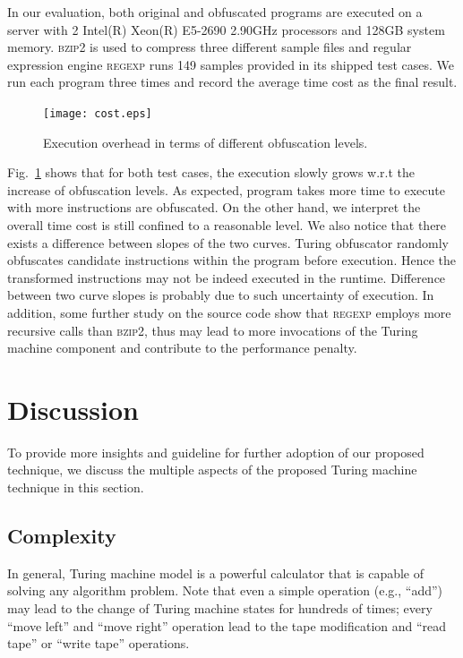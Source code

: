 \documentclass[lnicst]{svmultln}
\newcommand{\F}{Fig.}
\begin{document}
In our evaluation, both original and obfuscated programs are executed on a
server with 2 Intel(R) Xeon(R) E5-2690 2.90GHz processors and 128GB system
memory. \textsc{bzip2} is used to compress three different sample files and
regular expression engine \textsc{regexp} runs 149 samples provided in its
shipped test cases. We run each program three times and record the average
time cost as the final result.

\begin{figure}
  \texttt{[image: cost.eps]}
  \caption{Execution overhead in terms of different obfuscation levels.}
  \label{fig:cost}
\end{figure}

\F~\ref{fig:cost} shows that for both test cases, the execution slowly grows
w.r.t the increase of obfuscation levels. As expected, program takes more time
to execute with more instructions are obfuscated. On the other hand, we
interpret the overall time cost is still confined to a reasonable level. We also
notice that there exists a difference between slopes of the two curves. Turing
obfuscator randomly obfuscates candidate instructions within the program before
execution. Hence the transformed instructions may not be indeed executed in the
runtime. Difference between two curve slopes is probably due to such uncertainty
of execution. In addition, some further study on the source code show that
\textsc{regexp} employs more recursive calls than \textsc{bzip2}, thus may lead
to more invocations of the Turing machine component and contribute to the
performance penalty.



\section{Discussion}
\label{sec:discussion}
To provide more insights and guideline for further adoption of our proposed
technique, we discuss the multiple aspects of the proposed Turing machine
technique in this section.

\subsection{Complexity}
In general, Turing machine model is a powerful calculator that is capable of
solving any algorithm problem. Note that even a simple operation (e.g., ``add'')
may lead to the change of Turing machine states for hundreds of times; every
``move left'' and ``move right'' operation lead to the tape modification and
``read tape'' or ``write tape'' operations.
\end{document}
